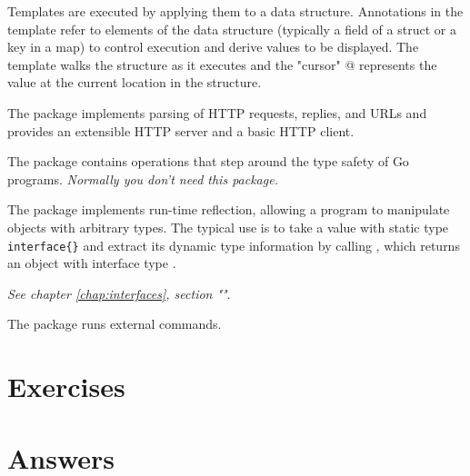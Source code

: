 \begin{description}
{Templates are executed by applying them to a data structure.  Annotations in
the template refer to elements of the data structure (typically a field of a
struct or a key in a map) to control execution and derive values to be
displayed.  The template walks the structure as it executes and the "cursor" @
represents the value at the current location in the structure.
}
\item[\package{http}]{
The  package implements parsing of HTTP requests, replies,
and URLs and provides an extensible HTTP server and a basic
HTTP client.
}
\item[\package{unsafe}]{
The  package contains operations that step around the type safety of Go programs.
\emph{Normally you don't need this package.}
}
\item[\package{reflect}]{
The  package implements run-time reflection, allowing a program to
manipulate objects with arbitrary types.  The typical use is to take a
value with static type \lstinline|interface{}| and extract its dynamic type
information by calling , which returns an object with interface
type .

\emph{See chapter \ref{chap:interfaces}, 
section ""}.
}
\item[\package{exec}]{
The  package runs external commands.
}
\end{description}

\section{Exercises}




\cleardoublepage
\section{Answers}
\shipoutAnswer
